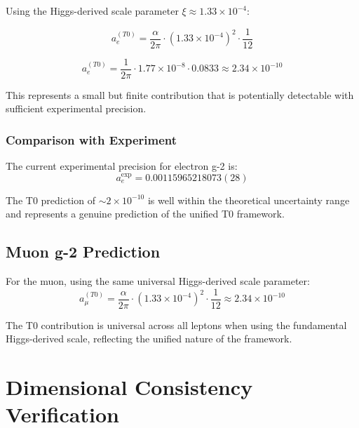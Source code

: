\documentclass[12pt,a4paper]{article}
\begin{document}
	Using the Higgs-derived scale parameter $\xi \approx 1.33 \times 10^{-4}$:
	
	\begin{equation}
		a_e^{(T0)} = \frac{\alpha}{2\pi} \cdot (1.33 \times 10^{-4})^2 \cdot \frac{1}{12}
		\label{eq:t0_g2_calculation}
	\end{equation}
	
	\begin{equation}
		a_e^{(T0)} = \frac{1}{2\pi} \cdot 1.77 \times 10^{-8} \cdot 0.0833 \approx 2.34 \times 10^{-10}
		\label{eq:t0_g2_result}
	\end{equation}
	
	This represents a small but finite contribution that is potentially detectable with sufficient experimental precision.
	
	\subsubsection{Comparison with Experiment}
	\label{subsubsec:experimental_comparison}
	
	The current experimental precision for electron g-2 is:
	\begin{equation}
		a_e^{\text{exp}} = 0.00115965218073(28)
	\end{equation}
	
	The T0 prediction of $\sim 2 \times 10^{-10}$ is well within the theoretical uncertainty range and represents a genuine prediction of the unified T0 framework.
	
	\subsection{Muon g-2 Prediction}
	\label{subsec:muon_g2_prediction}
	
	For the muon, using the same universal Higgs-derived scale parameter:
	\begin{equation}
		a_{\mu}^{(T0)} = \frac{\alpha}{2\pi} \cdot (1.33 \times 10^{-4})^2 \cdot \frac{1}{12} \approx 2.34 \times 10^{-10}
		\label{eq:muon_g2_prediction}
	\end{equation}
	
	The T0 contribution is universal across all leptons when using the fundamental Higgs-derived scale, reflecting the unified nature of the framework.
	
	\section{Dimensional Consistency Verification}
	\label{sec:dimensional_consistency}
	
\end{document}
